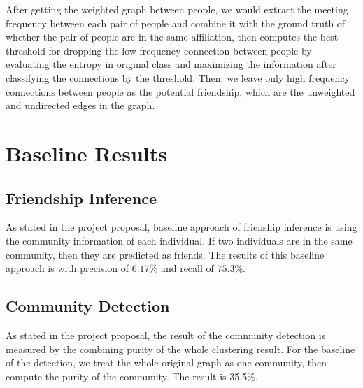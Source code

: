 \documentclass[11pt]{article}
\begin{document}
After getting the weighted graph between people, we would extract the meeting frequency between each pair of people and combine it with the ground truth of whether the pair of people are in the same affiliation, then computes the best threshold for dropping the low frequency connection between people by evaluating the entropy in original class and maximizing the information after classifying the connections by the threshold. Then, we leave only high frequency connections between people as the potential friendship, which are the unweighted and undirected edges in the graph.


\section{Baseline Results}
\subsection{Friendship Inference}
As stated in the project proposal, baseline approach of frienship inference is using the community information of each individual. If two individuals are in the same community, then they are predicted as friends. The results of this baseline approach is with precision of \(6.17\%\) and recall of \(75.3\%\).
\subsection{Community Detection}
As stated in the project proposal, the result of the community detection is measured by the combining purity of the whole clustering result. For the baseline of the detection, we treat the whole original graph as one community, then compute the purity of the community. The result is 35.5\%.


%
%

\end{document}
